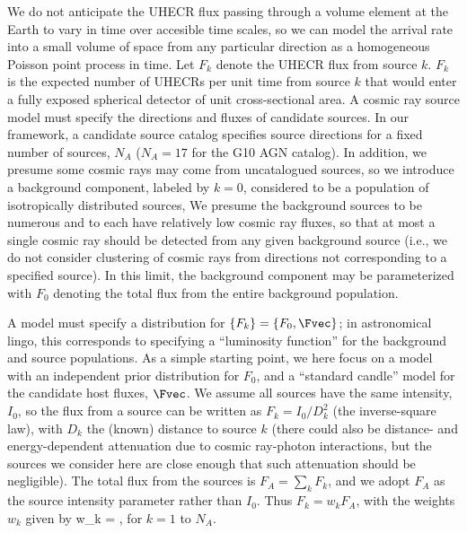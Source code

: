 We do not anticipate the UHECR flux passing through a volume element at the
Earth to vary in time over accesible time scales, so we can model the
arrival rate into a small volume of space from any particular direction as a
homogeneous Poisson point process in time.  Let $F_k$ denote the UHECR flux
from source $k$.  $F_k$ is the expected number of UHECRs per unit time from
source $k$ that would enter a fully exposed spherical detector of unit
cross-sectional area.  A cosmic ray source model must specify the directions
and fluxes of candidate sources.  In our framework, a candidate source
catalog specifies source directions for a fixed number of sources, $N_A$
($N_A = 17$ for the G10 AGN catalog).  In addition, we presume some cosmic
rays may come from uncatalogued sources, so we introduce a background
component, labeled by $k=0$, considered to be a population of isotropically
distributed sources,   We presume the background sources to be numerous
and to each have relatively low cosmic ray fluxes, so that at most a
single cosmic ray should be detected from any given background source
(i.e., we do not consider clustering of cosmic rays from directions not
corresponding to a specified source).  In this limit, the background
component may be parameterized with $F_0$ denoting the total flux from the
entire background population.


A model must specify a distribution for $\{F_k\} = \{F_0, \Fvec\}$; in
astronomical lingo, this corresponds to specifying a ``luminosity function''
for the background and source populations.  As a simple starting point, we
here focus on a model with an independent prior distribution for $F_0$, and
a ``standard candle'' model for the candidate host fluxes, $\Fvec$.  We
assume all sources have the same intensity, $I_0$, so the flux from a source
can be written as $F_k = I_0/D_k^2$ (the inverse-square law), with $D_k$ the
(known) distance to source $k$ (there could also be distance- and
energy-dependent attenuation due to cosmic ray-photon interactions, but the
sources we consider here are close enough that such attenuation should be
negligible).  The total flux from the sources is $F_A = \sum_k F_k$, and we
adopt $F_A$ as the source intensity parameter rather than $I_0$.  Thus
$F_k = w_k F_A$, with the weights $w_k$ given by
\be
w_k = ,
\label{wt-def}
\ee
for $k=1$ to $N_A$.

